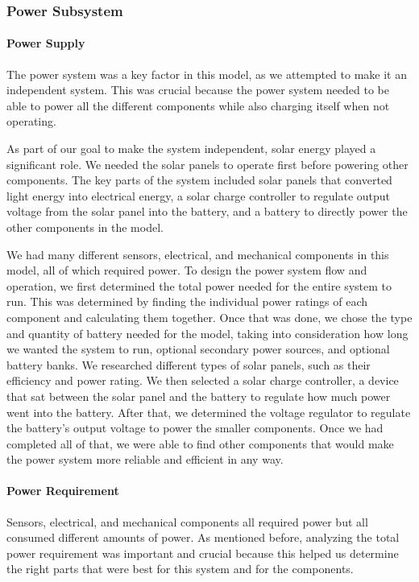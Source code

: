 
\subsubsection{Power Subsystem}\label{sec:ps-power}
\paragraph{Power Supply}
The power system was a key factor in this model, as we attempted to make it an independent system. This was crucial because the power system needed to be able to power all the different components while also charging itself when not operating.

As part of our goal to make the system independent, solar energy played a significant role. We needed the solar panels to operate first before powering other components. The key parts of the system included solar panels that converted light energy into electrical energy, a solar charge controller to regulate output voltage from the solar panel into the battery, and a battery to directly power the other components in the model.

We had many different sensors, electrical, and mechanical components in this model, all of which required power. To design the power system flow and operation, we first determined the total power needed for the entire system to run. This was determined by finding the individual power ratings of each component and calculating them together. Once that was done, we chose the type and quantity of battery needed for the model, taking into consideration how long we wanted the system to run, optional secondary power sources, and optional battery banks. We researched different types of solar panels, such as their efficiency and power rating. We then selected a solar charge controller, a device that sat between the solar panel and the battery to regulate how much power went into the battery. After that, we determined the voltage regulator to regulate the battery's output voltage to power the smaller components. Once we had completed all of that, we were able to find other components that would make the power system more reliable and efficient in any way.
\paragraph{Power Requirement}
Sensors, electrical, and mechanical components all required power but all consumed different amounts of power. As mentioned before, analyzing the total power requirement was important and crucial because this helped us determine the right parts that were best for this system and for the components.

